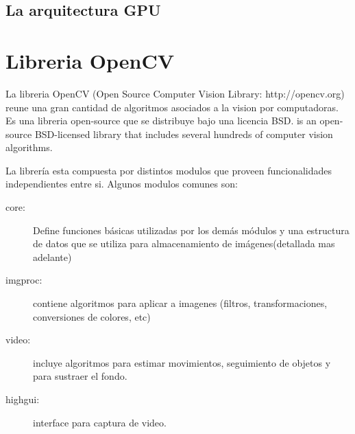 \documentclass[a4paper,10pt]{report}
\begin{document}
\section{La arquitectura GPU}

\chapter{Libreria OpenCV}

La libreria OpenCV (Open Source Computer Vision Library: http://opencv.org) reune una gran cantidad de algoritmos asociados a la vision por computadoras. 
Es una libreria open-source que se distribuye bajo una licencia BSD.  is an open-source BSD-licensed library that includes several hundreds of computer vision algorithms. 

La librería esta compuesta por distintos modulos que proveen funcionalidades independientes entre si. Algunos modulos comunes son:
\begin{description}
 \item[core:] Define funciones básicas utilizadas por los demás módulos y una estructura de datos que se utiliza para almacenamiento de imágenes(detallada mas adelante)  
 \item[imgproc:] contiene algoritmos para aplicar a imagenes (filtros, transformaciones, conversiones de colores, etc)
 \item[video:] incluye algoritmos para estimar movimientos, seguimiento de objetos y para sustraer el fondo.
 \item[highgui:] interface para captura de video.
\end{description}

\end{document}
